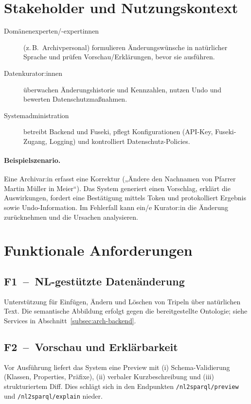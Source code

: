 \section{Stakeholder und Nutzungskontext}
\begin{description}
  \item[Domänenexperten/-expertinnen] (z.\,B.\ Archivpersonal) formulieren Änderungswünsche in natürlicher Sprache und prüfen Vorschau/Erklärungen, bevor sie ausführen.
  \item[Datenkurator:innen] überwachen Änderungshistorie und Kennzahlen, nutzen Undo und bewerten Datenschutzmaßnahmen.
  \item[Systemadministration] betreibt Backend und Fuseki, pflegt Konfigurationen (API-Key, Fuseki-Zugang, Logging) und kontrolliert Datenschutz-Policies.
\end{description}

\paragraph{Beispielszenario.} Eine Archivar:in erfasst eine Korrektur („Ändere den Nachnamen von Pfarrer Martin Müller in Meier“). Das System generiert einen Vorschlag, erklärt die Auswirkungen, fordert eine Bestätigung mittels Token und protokolliert Ergebnis sowie Undo-Information. Im Fehlerfall kann ein/e Kurator:in die Änderung zurücknehmen und die Ursachen analysieren.

\section{Funktionale Anforderungen}

\subsection*{F1~–~NL-gestützte Datenänderung}
Unterstützung für Einfügen, Ändern und Löschen von Tripeln über natürlichen Text. Die semantische Abbildung erfolgt gegen die bereitgestellte Ontologie; siehe Services in Abschnitt~\ref{subsec:arch-backend}.

\subsection*{F2~–~Vorschau und Erklärbarkeit}
Vor Ausführung liefert das System eine Preview mit (i) Schema-Validierung (Klassen, Properties, Präfixe), (ii) verbaler Kurzbeschreibung und (iii) strukturiertem Diff. Dies schlägt sich in den Endpunkten \texttt{/nl2sparql/preview} und \texttt{/nl2sparql/explain} nieder.

